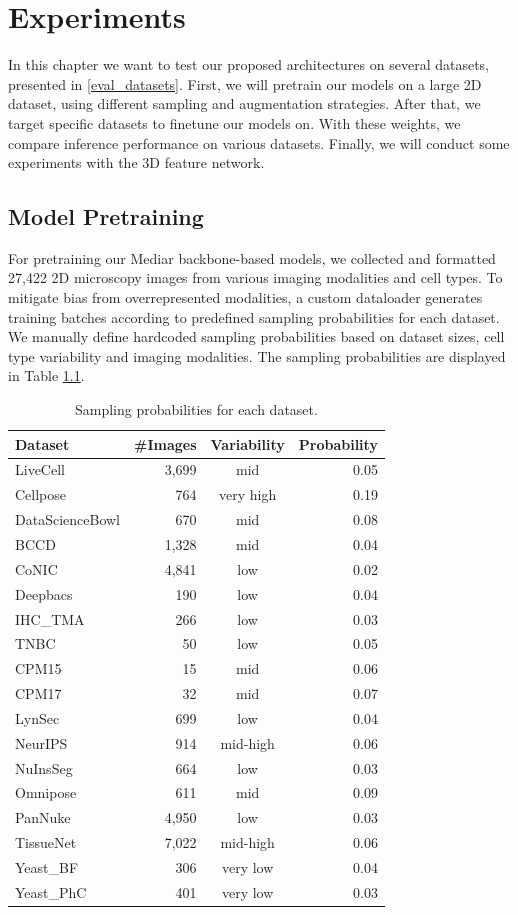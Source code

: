 \chapter{Experiments}

In this chapter we want to test our proposed architectures on several datasets, presented in \ref{eval_datasets}. 
First, we will pretrain our models on a large 2D dataset, using different sampling and augmentation strategies. After that, we target specific datasets to finetune our models on. With these weights, we compare inference performance on various datasets. Finally, we will conduct some experiments with the 3D feature network.


\section{Model Pretraining}
\label{chapter:4.1}

For pretraining our Mediar backbone-based models, we collected and formatted 27,422 2D microscopy images from various imaging modalities and cell types. To mitigate bias from overrepresented modalities, a custom dataloader generates training batches according to predefined sampling probabilities for each dataset. We manually define hardcoded sampling probabilities based on dataset sizes, cell type variability and imaging modalities. The sampling probabilities are displayed in Table \ref{tab:4.1}.

\begin{table}[ht]
\centering 
\footnotesize
\caption{Sampling probabilities for each dataset.} 
\label{tab:4.1}
\begin{tabular}{l r c r} 
\hline 
\textbf{Dataset} & \textbf{\#Images} & \textbf{Variability} & \textbf{Probability} \\ 
\midrule
\midrule
LiveCell & 3,699 & mid &  0.05 \\ 
Cellpose & 764 & very high & 0.19 \\ 
DataScienceBowl & 670 & mid & 0.08 \\ 
BCCD & 1,328 & mid & 0.04 \\ 
CoNIC & 4,841 & low & 0.02 \\ 
Deepbacs & 190 & low & 0.04 \\ 
IHC\_TMA & 266 & low & 0.03 \\ 
TNBC & 50 & low & 0.05 \\ 
CPM15 & 15& mid & 0.06 \\ 
CPM17 & 32 & mid & 0.07 \\ 
LynSec & 699 & low & 0.04 \\ 
NeurIPS & 914 & mid-high & 0.06 \\ 
NuInsSeg & 664 &low & 0.03 \\
Omnipose & 611 & mid & 0.09 \\ 
PanNuke & 4,950 &low & 0.03 \\ 
TissueNet & 7,022 & mid-high & 0.06 \\ 
Yeast\_BF & 306 & very low & 0.04 \\ 
Yeast\_PhC & 401 & very low & 0.03 \\ 
\hline 
\end{tabular} 
\end{table}


